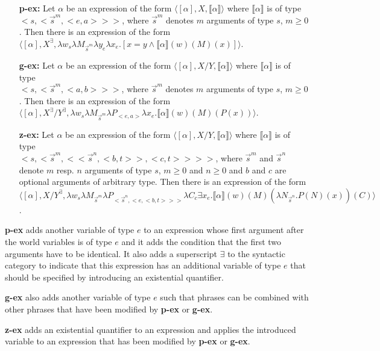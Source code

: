 \documentclass[parskip=half]{scrartcl}
\newcommand{\sem}[1]{\ensuremath{\llbracket#1\rrbracket}}
\begin{document}
\begin{enumerate}[\textbf{g-ex.}]
\item[\textbf{p-ex:}] Let $\alpha$  be an expression of the form $\langle [\alpha], X, \sem{\alpha} \rangle$ where $\sem{\alpha}$ is of type ${<s,<\vec{s}^m,<e,a>>>}$, where $\vec{s}^m$ denotes $m$ arguments of type $s$, $m\ge 0$. Then there is an expression of the form $\langle[\alpha], X^\exists, \lambda w_s  \lambda M_{\vec{s}^m} \lambda y_e \lambda x_e. [x = y \land \sem{\alpha}(w)(M)(x)]  \rangle$.
\item[\textbf{g-ex:}] Let $\alpha$  be an expression of the form $\langle [\alpha], X/Y, \sem{\alpha} \rangle$ where $\sem{\alpha}$ is of type \\$<s,<\vec{s}^m,<a,b>>>$, where $\vec{s}^m$ denotes $m$ arguments of type $s$, $m\ge 0$. Then there is an
expression of the form \\ $\langle[\alpha], X^\exists/Y^\exists, \lambda w_s \lambda M_{\vec{s}^m} \lambda P_{<e,a>} \lambda x_e. \sem{\alpha}(w)(M)(P(x))  \rangle$.  
\item[\textbf{z-ex:}] Let $\alpha$  be an expression of the form $\langle [\alpha], X/Y, \sem{\alpha} \rangle$ where $\sem{\alpha}$ is of type \\$<s,<\vec{s}^m,<<\vec{s}^n,<b,t>>,<c,t>>>>$, where $\vec{s}^m$ and $\vec{s}^n$ denote $m$ resp. $n$ arguments of type $s$, $m\ge 0$ and $n \ge 0$ and $b$ and $c$ are optional arguments of arbitrary type. Then there is an
expression of the form \\ $\langle[\alpha], X/Y^\exists, \lambda w_s  \lambda M_{\vec{s}^m} \lambda P_{<\vec{s}^n,<e,<b,t>>>} \lambda C_c \exists x_e. \sem{\alpha}(w)(M)(\lambda N_{\vec{s}^n}. P(N)(x))(C)  \rangle$.
\end{enumerate}

\textbf{p-ex} adds another variable of type $e$ to an expression whose first argument after the world variables is of type $e$ and it adds the condition that the first two arguments have to be identical. It also adds a superscript $\exists$ to the syntactic category to indicate that this expression has an additional variable of type $e$ that should be specified by introducing an existential quantifier.  

\textbf{g-ex} also adds another variable of type $e$ such that phrases can be combined with other phrases that have been modified by \textbf{p-ex} or \textbf{g-ex}.

\textbf{z-ex} adds an existential quantifier to an expression and applies the introduced variable to an expression that has been modified by \textbf{p-ex} or \textbf{g-ex}.
\end{document}
